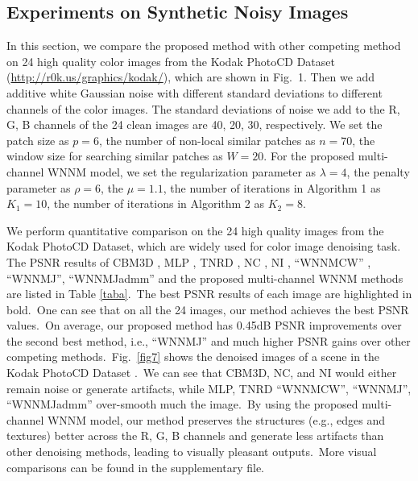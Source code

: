 \documentclass[10pt,twocolumn,letterpaper,sort&compress]{article}
\begin{document}
\subsection{Experiments on Synthetic Noisy Images}
In this section, we compare the proposed method with other competing method \cite{cbm3d,mlp,wnnm,csf,chen2015learning,noiseclinic,neatimage}
on 24 high quality color images from the Kodak PhotoCD Dataset (\url{http://r0k.us/graphics/kodak/}), which are shown in Fig.\ 1. Then we add additive white Gaussian noise with different standard deviations to different channels of the color images. The standard deviations of noise we add to the R, G, B channels of the 24 clean images are 40, 20, 30, respectively.  We set the patch size as $p = 6$, the number of non-local similar patches as $n = 70$, the window size for searching similar patches as $W = 20$. For the proposed multi-channel WNNM model, we set the regularization parameter as $\lambda=4$, the penalty parameter as $\rho=6$, the $\mu=1.1$, the number of iterations in Algorithm 1 as $K_{1} = 10$, the number of iterations in Algorithm 2 as $K_{2}=8$. 

We perform quantitative comparison on the 24 high quality images from the Kodak PhotoCD Dataset, which are widely used for color image denoising task. The PSNR results of CBM3D \cite{bm3d}, MLP \cite{mlp}, TNRD \cite{chen2015learning}, NC \cite{noiseclinic,ncwebsite}, NI \cite{neatimage}, ``WNNMCW'' \cite{wnnmijcv}, ``WNNMJ'', ``WNNMJadmm'' and the proposed multi-channel WNNM methods are listed in Table \ref{taba}.\ The best PSNR results of each image are highlighted in bold.\ One can see that on all the 24 images, our method achieves the best PSNR values.\ On average, our proposed method has 0.45dB PSNR improvements over the second best method, i.e., ``WNNMJ'' and much higher PSNR gains over other competing methods.\ Fig.\ \ref{fig7} shows the denoised images of a scene in the Kodak PhotoCD Dataset .\ We can see that CBM3D, NC, and NI would either remain noise or generate artifacts, while MLP, TNRD ``WNNMCW'', ``WNNMJ'', ``WNNMJadmm'' over-smooth much the image.\ By using the proposed multi-channel WNNM model, our method preserves the structures (e.g., edges and textures) better across the R, G, B channels and generate less artifacts than other denoising methods, leading to visually pleasant outputs.\ More visual comparisons can be found in the supplementary file.
\end{document}

